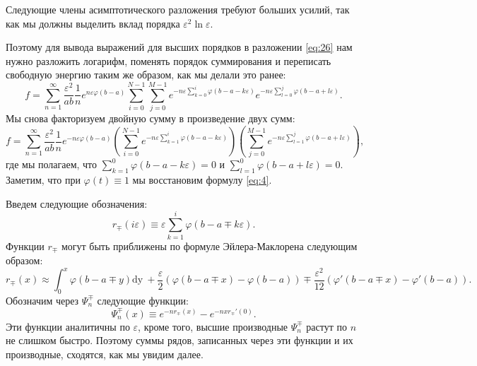 \documentclass{article}
\newcommand{\dy}{\mathrm{dy}~}
\begin{document}
Следующие члены асимптотического разложения требуют больших усилий, так как мы должны выделить вклад
порядка $\varepsilon^{2}\ln\varepsilon$. 

Поэтому для вывода выражений для высших порядков в разложении \eqref{eq:26} нам нужно разложить
логарифм, поменять порядок суммирования и переписать свободную энергию таким же образом, как мы
делали это ранее:
\begin{equation}
  \label{eq:22}
   f=\sum_{n=1}^{\infty}\frac{\varepsilon^{2}}{ab}\frac{1}{n}e^{n\varepsilon
     \varphi(b-a)}\sum_{i=0}^{N-1}\sum_{j=0}^{M-1} e^{-n\varepsilon\sum_{k=0}^{i}\varphi\left(b-a-k\varepsilon\right)}
    e^{-n\varepsilon\sum_{l=0}^{j}\varphi\left(b-a+l\varepsilon\right)}.
  \end{equation}
Мы снова факторизуем двойную сумму в произведение двух сумм:  
\begin{equation}
  \label{eq:23}
    f=\sum_{n=1}^{\infty}\frac{\varepsilon^{2}}{ab}\frac{1}{n}e^{-n\varepsilon
     \varphi(b-a)}\left(\sum_{i=0}^{N-1}
     e^{-n\varepsilon\sum_{k=1}^{i}\varphi\left(b-a-k\varepsilon\right)}\right)
   \left(\sum_{j=0}^{M-1}e^{-n\varepsilon\sum_{l=1}^{j}\varphi\left(b-a+l\varepsilon\right)}\right),
 \end{equation}
 где мы полагаем, что $\sum_{k=1}^{0}\varphi(b-a-k\varepsilon)=0$ и
$\sum_{l=1}^{0}\varphi(b-a+l\varepsilon)=0$. Заметим, что при  $\varphi(t)\equiv 1$ мы восстановим формулу
\eqref{eq:4}.

Введем следующие обозначения:
\begin{equation}
  \label{eq:52}
  r_{\mp}(i\varepsilon)\equiv\varepsilon\sum_{k=1}^{i}\varphi(b-a\mp k\varepsilon).
\end{equation}
Функции  $r_{\mp}$ могут быть приближены по формуле Эйлера-Маклорена следующим образом:
\begin{equation}
  \label{eq:53}
  r_{\mp}(x)\approx\int_{0}^{x}\varphi(b-a\mp y) \dy +\frac{\varepsilon}{2}\left(\varphi(b-a\mp
    x)-\varphi(b-a)\right)\mp \frac{\varepsilon^{2}}{12}\left(\varphi'(b-a\mp x)-\varphi'(b-a)\right).
\end{equation}
Обозначим через $\Psi_{n}^{\mp}$ следующие функции:
\begin{equation}
  \label{eq:54}
  \Psi^{\mp}_{n}(x)\equiv e^{-nr_{\mp}(x)}-e^{-nxr_{\mp}'(0)}.
\end{equation}
Эти функции аналитичны по  $\varepsilon$, кроме того, высшие производные  $\Psi^{\mp}_{n}$ растут по
$n$ не слишком быстро. Поэтому суммы рядов, записанных через эти функции и их производные, сходятся,
как мы увидим далее. 
\end{document}
